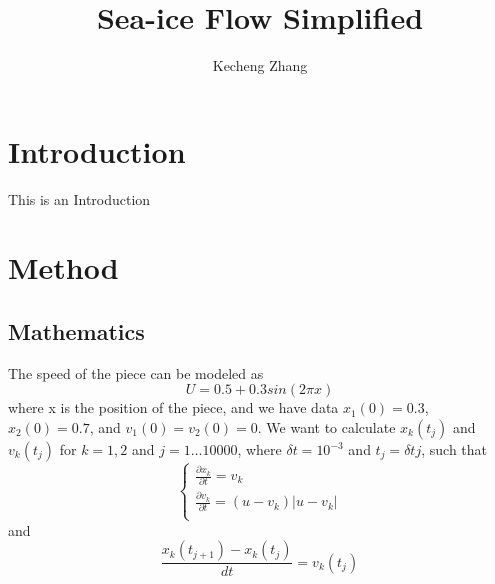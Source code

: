 \documentclass[12pt, a4paper]{article}
\begin{document}
\title{Sea-ice Flow Simplified}
\author{Kecheng Zhang}
\maketitle

\begin{abstract}
    
\end{abstract}

\section{Introduction}
This is an Introduction

\section{Method}

\subsection{Mathematics}
The speed of the piece can be modeled as
$$ U = 0.5 + 0.3sin(2 \pi x) $$
where x is the position of the piece, and we have data
$x_1(0) = 0.3$, $x_2(0) = 0.7$, and $v_1(0) = v_2(0) = 0$.
We want to calculate
$x_k(t_j)$ and $v_k(t_j)$ for $k = 1, 2$ and $j = 1\dots10000$, where
$\delta t = 10^{-3}$ and $t_j = \delta t j$, such that
$$\begin{cases}
    \frac{\partial x_k}{\partial t} = v_k\\
    \frac{\partial v_k}{\partial t} = (u - v_k) |u - v_k|\\
    \end{cases}$$
and $$ \frac{x_k(t_{j+1}) - x_k(t_j)}{dt} = v_k(t_j)$$
\end{document}
